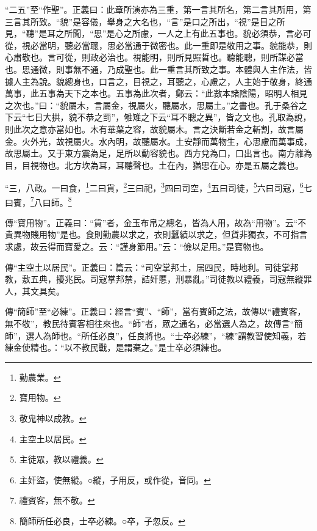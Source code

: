 {\noindent\shu{}\fzkt “二五”至“作聖”。正義曰：此章所演亦為三重，第一言其所名，第二言其所用，第三言其所致。“貌”是容儀，舉身之大名也，“言”是口之所出，“視”是目之所見，“聽”是耳之所聞，“思”是心之所慮，一人之上有此五事也。貌必須恭，言必可從，視必當明，聽必當聰，思必當通于微密也。此一重即是敬用之事。貌能恭，則心肅敬也。言可從，則政必治也。視能明，則所見照晢也。聽能聰，則所謀必當也。思通微，則事無不通，乃成聖也。此一重言其所致之事。本體與人主作法，皆據人主為說。貌總身也，口言之，目視之，耳聽之，心慮之，人主始于敬身，終通萬事，此五事為天下之本也。五事為此次者，鄭云：“此數本諸陰陽，昭明人相見之次也。”曰：“貌屬木，言屬金，視屬火，聽屬水，思屬土。”之書也。孔于桑谷之下云“七日大拱，貌不恭之罰”，雊雉之下云“耳不聰之異”，皆之文也。孔取為說，則此次之意亦當如也。木有華葉之容，故貌屬木。言之決斷若金之斬割，故言屬金。火外光，故視屬火。水內明，故聽屬水。土安靜而萬物生，心思慮而萬事成，故思屬土。又于東方震為足，足所以動容貌也。西方兌為口，口出言也。南方離為目，目視物也。北方坎為耳，耳聽聲也。土在內，猶思在心。亦是五屬之義也。 \par}

“三，八政。一曰食，\footnote{勤農業。}二曰貨，\footnote{寶用物。}三曰祀，\footnote{敬鬼神以成教。}四曰司空，\footnote{主空土以居民。}五曰司徒，\footnote{主徒眾，教以禮義。}六曰司寇，\footnote{主奸盜，使無縱。○縱，子用反，或作從，音同。}七曰賓，\footnote{禮賓客，無不敬。}八曰師。\footnote{簡師所任必良，士卒必練。○卒，子忽反。}

{\noindent\zhuan{}\fzbyks 傳“寶用物”。正義曰：“貨”者，金玉布帛之總名，皆為人用，故為“用物”。云“不貴異物賤用物”是也。食則勤農以求之，衣則蠶績以求之，但貨非獨衣，不可指言求處，故云得而寶愛之。云：“謹身節用。”云：“儉以足用。”是寶物也。 \par}

{\noindent\zhuan{}\fzbyks 傳“主空土以居民”。正義曰：篇云：“司空掌邦土，居四民，時地利。司徒掌邦教，敷五典，擾兆民。司寇掌邦禁，詰奸慝，刑暴亂。”司徒教以禮義，司寇無縱罪人，其文具矣。 \par}

{\noindent\zhuan{}\fzbyks 傳“簡師”至“必練”。正義曰：經言“賓”、“師”，當有賓師之法，故傳以“禮賓客，無不敬”，教民待賓客相往來也。“師”者，眾之通名，必當選人為之，故傳言“簡師”，選人為師也。“所任必良”，任良將也。“士卒必練”，“練”謂教習使知義，若練金使精也。：“以不教民戰，是謂棄之。”是士卒必須練也。 \par}

